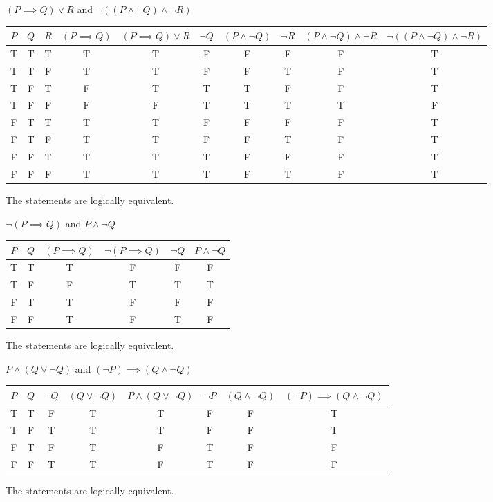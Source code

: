 \documentclass[DIN, pagenumber=false, fontsize=11pt, parskip=half]{scrartcl}
\begin{document}
\begin{problems}[from=10]
    \problem $(P \implies Q) \lor R$ and $\lnot((P \land \lnot Q) \land \lnot R)$
    \answer
    \begin{center}
        \footnotesize
        \setlength{\tabcolsep}{4pt}
        \begin{tabular}{cccccccccc}
            $P$ & $Q$ & $R$ & $(P \implies Q)$ & $(P \implies Q) \lor R$ & $\lnot Q$ & $(P \land \lnot Q)$ & $\lnot R$ & $(P \land \lnot Q) \land \lnot R$ & $\lnot((P \land \lnot Q) \land \lnot R)$\\
            \midrule
            T & T & T & T & T & F & F & F & F & T\\
            T & T & F & T & T & F & F & T & F & T\\
            T & F & T & F & T & T & T & F & F & T\\
            T & F & F & F & F & T & T & T & T & F\\
            F & T & T & T & T & F & F & F & F & T\\
            F & T & F & T & T & F & F & T & F & T\\
            F & F & T & T & T & T & F & F & F & T\\
            F & F & F & T & T & T & F & T & F & T
        \end{tabular}
    \end{center}
    The statements are logically equivalent.

    \problem $\lnot (P \implies Q)$ and $P \land \lnot Q$
    \answer
    \begin{center}
        \begin{tabular}{cccccc}
            $P$ & $Q$ & $(P \implies Q)$ & $\lnot (P \implies Q)$ & $\lnot Q$ & $P \land \lnot Q$\\
            \midrule
            T & T & T & F & F & F\\
            T & F & F & T & T & T\\
            F & T & T & F & F & F\\
            F & F & T & F & T & F
        \end{tabular}
    \end{center}
    The statements are logically equivalent.

    \problem $P \land (Q \lor \lnot Q)$ and $(\lnot P) \implies (Q \land \lnot Q)$
    \answer
    \begin{center}
        \small
        \begin{tabular}{cccccccc}
            $P$ & $Q$ & $\lnot Q$ & $(Q \lor \lnot Q)$ & $P \land (Q \lor \lnot Q)$ & $\lnot P$ & $(Q \land \lnot Q)$ & $(\lnot P) \implies (Q \land \lnot Q)$\\
            \midrule
            T & T & F & T & T & F & F & T\\
            T & F & T & T & T & F & F & T\\
            F & T & F & T & F & T & F & F\\
            F & F & T & T & F & T & F & F
        \end{tabular}
    \end{center}
    The statements are logically equivalent.
\end{problems}
\end{document}
